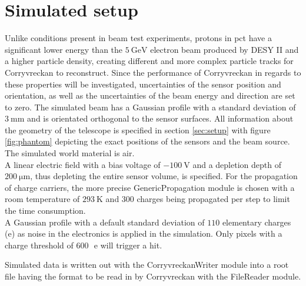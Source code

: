 \section{Simulated setup}
Unlike conditions present in beam test experiments, protons in pct have a significant lower energy than the $\SI{5}{\giga\eV}$
electron beam produced by DESY II and a higher particle density, creating different and more complex particle tracks for
Corryvreckan to reconstruct. Since the performance of Corryvreckan in regards to these properties will be investigated, uncertainties
of the sensor position and orientation, as well as the uncertainties of the beam energy and direction are set to zero. The simulated
beam has a Gaussian profile with a standard deviation of $\SI{3}{\milli\meter}$ and is orientated orthogonal to the sensor
surfaces. All information about the geometry of the telescope is specified in section \ref{sec:setup} with
figure \ref{fig:phantom} depicting the exact positions of the sensors and the beam source. The simulated world material is air.\\ %
A linear electric field with a bias voltage of $\SI{-100}{\volt}$ and a depletion depth of $\SI{200}{\micro\meter}$,
thus depleting the entire sensor volume, is specified. For the propagation of charge carriers, the more precise GenericPropagation
module is chosen with a room temperature of $\SI{293}{\kelvin}$ and 300 charges being propagated per step to limit the time consumption.\\
A Gaussian profile with a default standard deviation of $110$ elementary charges (e) as noise in the electronics is applied in the simulation.
Only pixels with a charge threshold of \mbox{$600$\, e} will trigger a hit.

Simulated data is written out with the CorryvreckanWriter module into a root file having the format to be read
in by Corryvreckan with the FileReader module.

